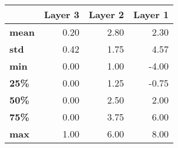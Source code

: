 \begin{tabular}{lrrr}
\toprule
{} &  Layer 3 &  Layer 2 &  Layer 1 \\
\midrule
\textbf{mean} &     0.20 &     2.80 &     2.30 \\
\textbf{std } &     0.42 &     1.75 &     4.57 \\
\textbf{min } &     0.00 &     1.00 &    -4.00 \\
\textbf{25\% } &     0.00 &     1.25 &    -0.75 \\
\textbf{50\% } &     0.00 &     2.50 &     2.00 \\
\textbf{75\% } &     0.00 &     3.75 &     6.00 \\
\textbf{max } &     1.00 &     6.00 &     8.00 \\
\bottomrule
\end{tabular}
